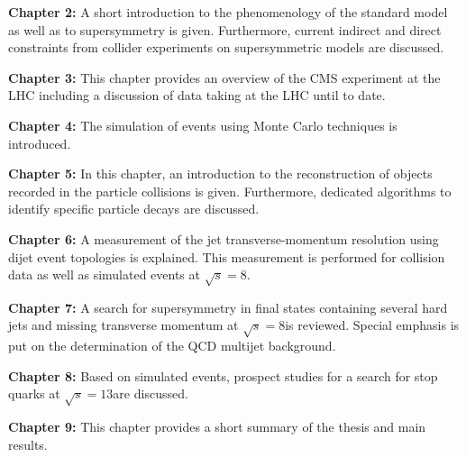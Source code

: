 \begin{description}
 \item \textbf{Chapter 2:} A short introduction to the phenomenology of the standard model as well as to supersymmetry is given. Furthermore, current indirect and direct constraints from collider experiments on supersymmetric models are discussed.
 \item \textbf{Chapter 3:} This chapter provides an overview of the CMS experiment at the LHC including a discussion of data taking at the LHC until to date.
 \item \textbf{Chapter 4:} The simulation of events using Monte Carlo techniques is introduced.
 \item \textbf{Chapter 5:} In this chapter, an introduction to the reconstruction of objects recorded in the particle collisions is given. Furthermore, dedicated algorithms to identify specific particle decays are discussed.
 \item \textbf{Chapter 6:} A measurement of the jet transverse-momentum resolution using dijet event topologies is explained. This measurement is performed for \pp collision data as well as simulated events at $\sqrt{s} = 8$\tev.
 \item \textbf{Chapter 7:} A search for supersymmetry in final states containing several hard jets and missing transverse momentum at $\sqrt{s} = 8$\tev is reviewed. Special emphasis is put on the determination of the QCD multijet background.
 \item \textbf{Chapter 8:} Based on simulated events, prospect studies for a search for stop quarks at $\sqrt{s} = 13$\tev are discussed.
 \item \textbf{Chapter 9:} This chapter provides a short summary of the thesis and main results.
\end{description}
